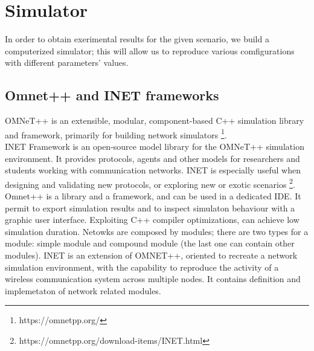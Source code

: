 %
\chapter{Simulator}\label{simulator}
In order to obtain exerimental results for the given scenario, we build a computerized simulator;
this will allow us to reproduce various comfigurations with different parameters' values.\\
\section{Omnet++ and INET frameworks}
OMNeT++ is an extensible, modular, component-based C++ simulation library and framework, 
primarily for building network simulators \footnote{https://omnetpp.org/}.\\
INET Framework is an open-source model library for the OMNeT++ simulation environment. 
It provides protocols, agents and other models for researchers and students working with 
communication networks. INET is especially useful when designing and validating new protocols, 
or exploring new or exotic scenarios \footnote{https://omnetpp.org/download-items/INET.html}.\\
Omnet++ is a library and a framework, and can be used in a dedicated IDE. It permit to export simulation results
and to inspect simulaton behaviour with a graphic user interface. Exploiting C++ compiler optimizations, can achieve low simulation duration.
Netowks are composed by modules; there are two types for a module: simple module and compound module (the last one can contain other modules).
INET is an extension of OMNET++, oriented to recreate a network simulation environment, with the capability to reproduce the activity
of a wireless communication system across multiple nodes. It contains definition and implemetaton of network related modules.
